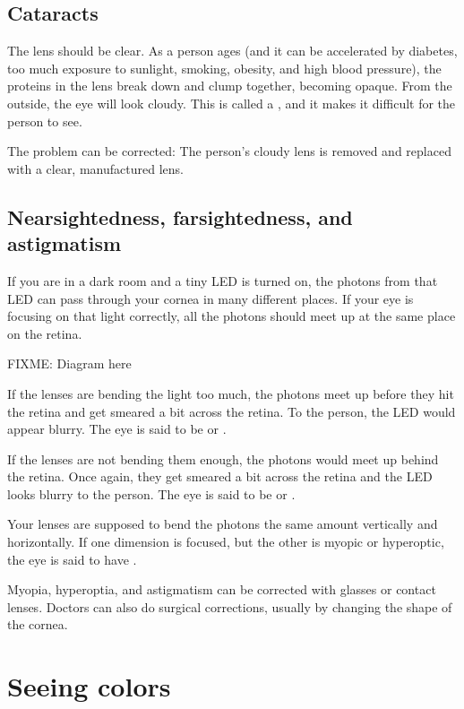 \subsection{Cataracts}

The lens should be clear. As a person ages (and it can be accelerated
by diabetes, too much exposure to sunlight, smoking, obesity, and high
blood pressure), the proteins in the lens break down and clump
together, becoming opaque. From the outside, the eye will look
cloudy. This is called a , and it makes it difficult
for the person to see.

The problem can be corrected: The person's cloudy lens is removed and
replaced with a clear, manufactured lens.

\subsection{Nearsightedness, farsightedness, and astigmatism}

If you are in a dark room and a tiny LED is turned on, the photons
from that LED can pass through your cornea in many different places.
If your eye is focusing on that light correctly, all the photons
should meet up at the same place on the retina.

FIXME: Diagram here

If the lenses are bending the light too much, the photons meet up before they hit the
retina and get smeared a bit across the retina. To the person, the LED
would appear blurry. The eye is said to be  or
.

If the lenses are not bending them enough, the photons would meet up
behind the retina.  Once again, they get smeared a bit across the
retina and the LED looks blurry to the person. The eye is said to be
 or .

Your lenses are supposed to bend the photons the same amount
vertically and horizontally. If one dimension is focused, but the
other is myopic or hyperoptic, the eye is said to have .

Myopia, hyperoptia, and astigmatism can be corrected with glasses or contact
lenses. Doctors can also do surgical corrections, usually by changing
the shape of the cornea.

\section{Seeing colors}

